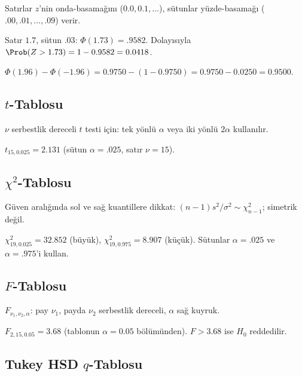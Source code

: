 Satırlar $z$'nin onda-basamağını ($0.0,0.1,\ldots$), sütunlar yüzde-basamağı ($.00,.01,\ldots,.09$) verir.

\begin{ornek}[$\Phi(1.73)$]
Satır $1.7$, sütun $.03$: $\Phi(1.73) = .9582$. Dolayısıyla $\Prob(Z>1.73)=1-0.9582=0.0418$.
\end{ornek}

\begin{ornek}
$\Phi(1.96)-\Phi(-1.96) = 0.9750-(1-0.9750) = 0.9750-0.0250 = 0.9500$.
\end{ornek}

\subsection{$t$-Tablosu}

$\nu$ serbestlik dereceli $t$ testi için: tek yönlü $\alpha$ veya iki yönlü $2\alpha$ kullanılır.

\begin{ornek}[İki yönlü \%95 $t$-aralığı, $\nu=15$]
$t_{15,0.025}=2.131$ (sütun $\alpha=.025$, satır $\nu=15$).
\end{ornek}

\subsection{$\chi^2$-Tablosu}

Güven aralığında sol ve sağ kuantillere dikkat: $(n-1)s^2/\sigma^2 \sim \chi^2_{n-1}$; simetrik değil.

\begin{ornek}[Varyans \%95 GA, $\nu=19$]
$\chi^2_{19,0.025}=32.852$ (büyük), $\chi^2_{19,0.975}=8.907$ (küçük). Sütunlar $\alpha=.025$ ve $\alpha=.975$'i kullan.
\end{ornek}

\subsection{$F$-Tablosu}

$F_{\nu_1,\nu_2,\alpha}$: pay $\nu_1$, payda $\nu_2$ serbestlik dereceli, $\alpha$ sağ kuyruk.

\begin{ornek}[ANOVA --- $k=3$, $N=18$ ($\nu_1=2$, $\nu_2=15$)]
$F_{2,15,0.05}=3.68$ (tablonun $\alpha=0.05$ bölümünden). $F > 3.68$ ise $H_0$ reddedilir.
\end{ornek}

\subsection{Tukey HSD $q$-Tablosu}

